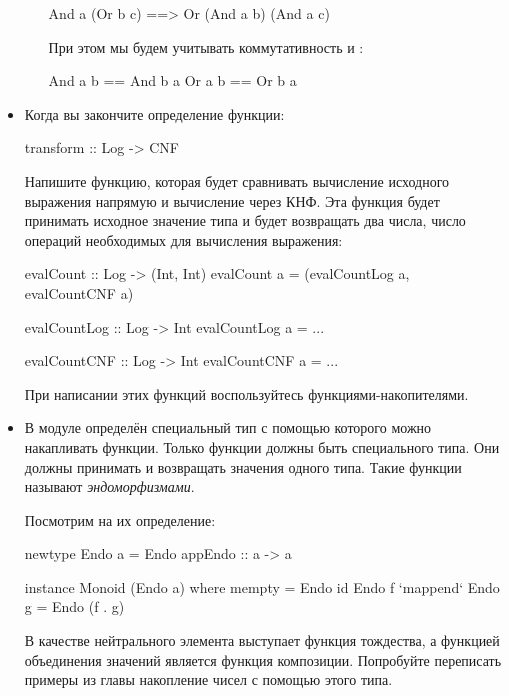 \begin{itemize}
\begin{itemize}
\begin{code}
And a (Or b c)  ==> Or (And a b) (And a c)
\end{code}

При этом мы будем учитывать коммутативность
 и :

\begin{code}
And a b  == And b a
Or  a b  == Or  b a
\end{code}

\end{itemize}

\item Когда вы закончите определение функции:

\begin{code}
transform :: Log -> CNF
\end{code}

Напишите функцию, которая будет сравнивать
вычисление исходного выражения напрямую
и вычисление через КНФ. Эта функция будет
принимать исходное значение типа 
и будет возвращать два числа, число операций
необходимых для вычисления выражения: 

\begin{code}
evalCount :: Log -> (Int, Int)
evalCount a = (evalCountLog a, evalCountCNF a)

evalCountLog :: Log -> Int
evalCountLog a = ...

evalCountCNF :: Log -> Int
evalCountCNF a = ...
\end{code}

При написании этих функций воспользуйтесь
функциями-накопителями.


\item В модуле  определён специальный
тип с помощью которого можно накапливать функции.
Только функции должны быть специального типа. Они должны
принимать и возвращать значения одного типа. Такие функции
называют \emph{эндоморфизмами}.

Посмотрим на их определение:

\begin{code}
newtype Endo a = Endo { appEndo :: a -> a }

instance Monoid (Endo a) where
        mempty = Endo id
        Endo f `mappend` Endo g = Endo (f . g)
\end{code}

В качестве нейтрального элемента выступает функция тождества,
а функцией объединения значений является функция композиции.
Попробуйте переписать примеры из главы накопление чисел
с помощью этого типа.

\end{itemize}


